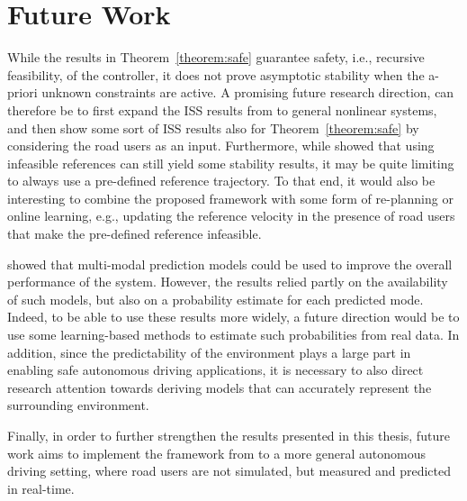 \section{Future Work}
While the results in Theorem~\ref{theorem:safe} guarantee safety, i.e., recursive feasibility, of the controller, it does not prove asymptotic stability when the a-priori unknown constraints are active. A promising future research direction, can therefore be to first expand the ISS results from \paperISS{} to general nonlinear systems, and then show some sort of ISS results also for Theorem~\ref{theorem:safe} by considering the road users as an input. Furthermore, while \paperISS{} showed that using infeasible references can still yield some stability results, it may be quite limiting to always use a pre-defined reference trajectory. To that end, it would also be interesting to combine the proposed framework with some form of re-planning or online learning, e.g., updating the reference velocity in the presence of road users that make the pre-defined reference infeasible.


\paperScenario{} showed that multi-modal prediction models could be used to improve the overall performance of the system. However, the results relied partly on the availability of such models, but also on a probability estimate for each predicted mode. Indeed, to be able to use these results more widely, a future direction would be to use some learning-based methods to estimate such probabilities from real data. In addition, since the predictability of the environment plays a large part in enabling safe autonomous driving applications, it is necessary to also direct research attention towards deriving models that can accurately represent the surrounding environment.


Finally, in order to further strengthen the results presented in this thesis, future work aims to implement the framework from \paperExp{} to a more general autonomous driving setting, where road users are not simulated, but measured and predicted in real-time.







